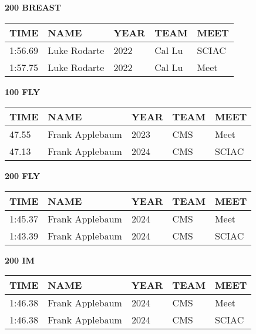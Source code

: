 \vspace{0.4cm}

\begin{minipage}[t]{0.48\textwidth}
\centering
\textbf{200 BREAST}\\[0.05cm]
\begin{tabular}{@{}p{1.8cm}p{2.8cm}p{1.2cm}p{1.4cm}p{1.4cm}@{}}
\hline
\textbf{TIME} & \textbf{NAME} & \textbf{YEAR} & \textbf{TEAM} & \textbf{MEET} \\
\hline
1:56.69 & Luke Rodarte & 2022 & Cal Lu & SCIAC \\
1:57.75 & Luke Rodarte & 2022 & Cal Lu & Meet \\
\hline
\end{tabular}
\end{minipage}\hfill
\begin{minipage}[t]{0.48\textwidth}
\centering
\textbf{100 FLY}\\[0.05cm]
\begin{tabular}{@{}p{1.8cm}p{2.8cm}p{1.2cm}p{1.4cm}p{1.4cm}@{}}
\hline
\textbf{TIME} & \textbf{NAME} & \textbf{YEAR} & \textbf{TEAM} & \textbf{MEET} \\
\hline
47.55 & Frank Applebaum & 2023 & CMS & Meet \\
47.13 & Frank Applebaum & 2024 & CMS & SCIAC \\
\hline
\end{tabular}
\end{minipage}

\vspace{0.4cm}

\begin{minipage}[t]{0.48\textwidth}
\centering
\textbf{200 FLY}\\[0.05cm]
\begin{tabular}{@{}p{1.8cm}p{2.8cm}p{1.2cm}p{1.4cm}p{1.4cm}@{}}
\hline
\textbf{TIME} & \textbf{NAME} & \textbf{YEAR} & \textbf{TEAM} & \textbf{MEET} \\
\hline
1:45.37 & Frank Applebaum & 2024 & CMS & Meet \\
1:43.39 & Frank Applebaum & 2024 & CMS & SCIAC \\
\hline
\end{tabular}
\end{minipage}\hfill
\begin{minipage}[t]{0.48\textwidth}
\centering
\textbf{200 IM}\\[0.05cm]
\begin{tabular}{@{}p{1.8cm}p{2.8cm}p{1.2cm}p{1.4cm}p{1.4cm}@{}}
\hline
\textbf{TIME} & \textbf{NAME} & \textbf{YEAR} & \textbf{TEAM} & \textbf{MEET} \\
\hline
1:46.38 & Frank Applebaum & 2024 & CMS & Meet \\
1:46.38 & Frank Applebaum & 2024 & CMS & SCIAC \\
\hline
\end{tabular}
\end{minipage}

